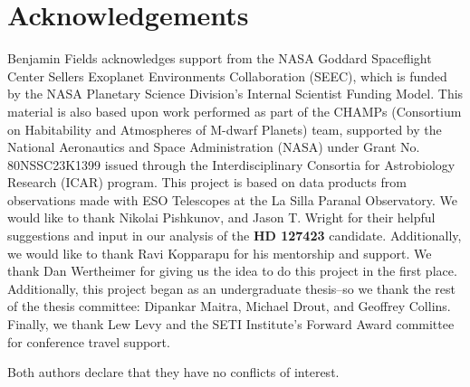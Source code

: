 \documentclass[linenumbers]{aastex701}
\providecommand{\DIFadd}[1]{{\bf #1}} %
\providecommand{\DIFaddbegin}{} %
\providecommand{\DIFaddend}{} %
\begin{document}
\section{Acknowledgements}
Benjamin Fields acknowledges support from the NASA Goddard Spaceflight Center Sellers Exoplanet Environments Collaboration (SEEC), which is funded by the NASA Planetary Science Division's Internal Scientist Funding Model. This material is also based upon work performed as part of the CHAMPs (Consortium on Habitability and Atmospheres of M-dwarf Planets) team, supported by the National Aeronautics and Space Administration (NASA) under Grant No. 80NSSC23K1399 issued through the Interdisciplinary Consortia for Astrobiology Research (ICAR) program.  This project is based on data products from observations made with ESO Telescopes at the La Silla Paranal Observatory. We would like to thank Nikolai Pishkunov, and Jason T. Wright for their helpful suggestions and input in our analysis of the  \DIFaddbegin \DIFadd{HD 127423 }\DIFaddend candidate. Additionally, we would like to thank Ravi Kopparapu for his mentorship and support. We thank Dan Wertheimer for giving us the idea to do this project in the first place. Additionally, this project began as an undergraduate thesis--so we thank the rest of the thesis committee: Dipankar Maitra, Michael Drout, and Geoffrey Collins. Finally, we thank Lew Levy and the SETI Institute's Forward Award committee for conference travel support.

Both authors declare that they have no conflicts of interest.
\clearpage
\onecolumngrid

\appendix
\end{document}
